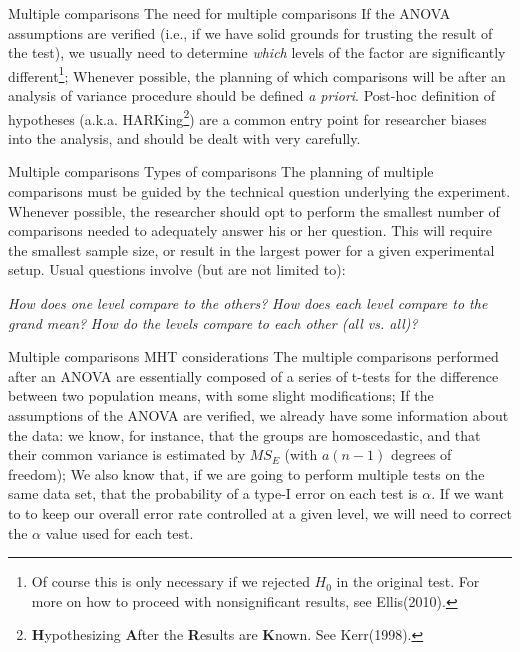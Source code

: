 \documentclass[t]{beamer}
\begin{document}

\begin{ftst}
{Multiple comparisons}
{The need for multiple comparisons}
If the ANOVA assumptions are verified (i.e., if we have solid grounds for trusting the result of the test), we usually need to determine \textit{which} levels of the factor are significantly different\footnote[1]{\tiny Of course this is only necessary if we rejected $H_0$ in the original test. For more on how to proceed with nonsignificant results, see Ellis(2010).};
\vone
Whenever possible, the planning of which comparisons will be after an analysis of variance procedure should be defined \textit{a priori}. Post-hoc definition of hypotheses (a.k.a.  HARKing\footnote[2]{\tiny\textbf{H}ypothesizing \textbf{A}fter the \textbf{R}esults are \textbf{K}nown. See Kerr(1998).}) are a common entry point for researcher biases into the analysis, and should be dealt with very carefully.
\end{ftst}


\begin{ftst}
{Multiple comparisons}
{Types of comparisons}
The planning of multiple comparisons must be guided by the technical question underlying the experiment.
\vone
Whenever possible, the researcher should opt to perform the smallest number of comparisons needed to adequately answer his or her question. This will require the smallest sample size, or result in the largest power for a given experimental setup.
\vone
Usual questions involve (but are not limited to):

\bitems\textit{How does one level compare to the others?}
\spitem\textit{How does each level compare to the grand mean?}
\spitem\textit{How do the levels compare to each other (all vs. all)?}
\eitem
\end{ftst}


\begin{ftst}
{Multiple comparisons}
{MHT considerations}
The multiple comparisons performed after an ANOVA are essentially composed of a series of t-tests for the difference between two population means, with some slight modifications;
\vone
If the assumptions of the ANOVA are verified, we already have some information about the data: we know, for instance, that the groups are homoscedastic, and that their common variance is estimated by $MS_E$ (with $a(n-1)$ degrees of freedom);
\vone
We also know that, if we are going to perform multiple tests on the same data set, that the probability of a type-I error on each test is $\alpha$. If we want to to keep our overall error rate controlled at a given level, we will need to correct the $\alpha$ value used for each test.%
\end{ftst}
\end{document}
